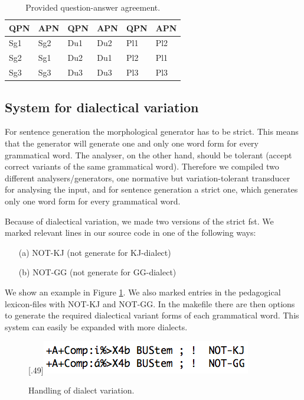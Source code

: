 \documentclass[11pt]{article}
\begin{document}
\begin{table}[htdp]
\caption{Provided question-answer agreement.}
\begin{center}
\begin{tabular}[t]{ll|ll|ll}
QPN &APN &QPN &APN &QPN &APN \\
\hline
Sg1 &Sg2 &Du1 &Du2 &Pl1 &Pl2 \\
Sg2 &Sg1 &Du2 &Du1 &Pl2 &Pl1 \\
Sg3 &Sg3 &Du3 &Du3 &Pl3 &Pl3 \\
\hline
\end{tabular}
\end{center}
\label{QA}
\end{table}

\subsection{System for dialectical variation}\label{dialect}
For sentence generation the morphological generator has to be strict. This means that the generator will generate one and only one word form for every grammatical word. The analyser, on the other hand, should be tolerant (accept correct variants of the same grammatical word). Therefore we compiled two different analysers/generators, one normative but variation-tolerant transducer for analysing the input, and for sentence generation a strict one, which generates only one word form for every grammatical word.

Because of dialectical variation, we made two versions of the strict fst. We marked relevant lines in our source code in one of the following ways:

\begin{example}\label{ped}
\begin{itemize}
\item[(a)] NOT-KJ (not generate for KJ-dialect) 
\item[(b)] NOT-GG (not generate for GG-dialect)  
\end{itemize}
\end{example}

We show an example in Figure \ref{smelex}. We also marked entries in the pedagogical lexicon-files with NOT-KJ and NOT-GG. In the makefile there are then options to generate the required dialectical variant forms of each grammatical word. This system can easily be expanded with more dialects.


\begin{figure}[htbp]
\begin{center}
\scalebox{.49}[.49]{\includegraphics{presentation/img/smelex3.png}}\\
\caption{Handling of dialect variation.}
\label{smelex}
\end{center}
\end{figure}
\end{document}

